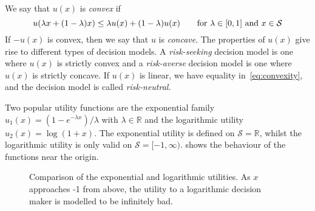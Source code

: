 \documentclass[main.tex]{subfiles}
\begin{document}
\begin{mydef}[Convexity]
  We say that $u(x)$ is \emph{convex} if
  \begin{equation}\label{eq:convexity}
    u(\lambda x + (1-\lambda)x)\leq
    \lambda u(x) + (1-\lambda) u(x)\qquad \textnormal{for $\lambda\in[0,1]$ and
      $x\in\mathcal{S}$}
  \end{equation}
  If $-u(x)$ is convex, then we say that $u$ is
  \emph{concave}.
  The properties of $u(x)$ give rise to different types of decision models.
  A \emph{risk-seeking} decision model is one where $u(x)$
  is strictly convex and a \emph{risk-averse} decision model is one where
  $u(x)$ is strictly concave.
  If $u(x)$ is linear, we have equality in~\eqref{eq:convexity}, and
  the decision model is called \emph{risk-neutral}.
\end{mydef}

\begin{example}
  Two popular utility functions are the exponential family
  $u_1(x)=(1-e^{-\lambda x})/\lambda$ with $\lambda\in\mathbb{R}$ and the logarithmic
  utility $u_2(x)=\log(1+x)$.
  The exponential utility is defined on $\mathcal{S} =\mathbb{R}$,
  whilst the logarithmic utility is only valid on
  $\mathcal{S}=[-1,\infty)$.
   shows the behaviour of the functions
  near the origin.
  \begin{figure}[htbp]
    \centering
    \caption{Comparison of the exponential and logarithmic
      utilities. As $x$ approaches -1 from above, the utility to a logarithmic
      decision maker is modelled to be infinitely bad.
    }\label{fig:example_utilities}
  \end{figure}
\end{example}
\end{document}
